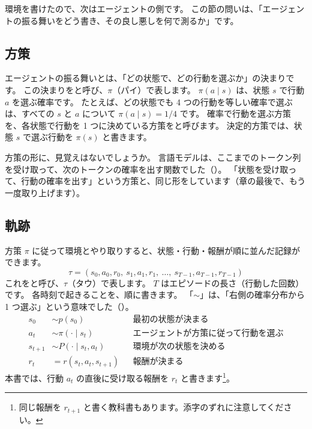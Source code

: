環境を書けたので、次はエージェントの側です。
この節の問いは、「エージェントの振る舞いをどう書き、その良し悪しを何で測るか」です。

\subsection*{方策}

エージェントの振る舞いとは、「どの状態で、どの行動を選ぶか」の決まりです。
この決まりをと呼び、$\pi$（パイ）で表します。
$\pi(a\mid s)$ は、状態 $s$ で行動 $a$ を選ぶ確率です。
たとえば、どの状態でも 4 つの行動を等しい確率で選ぶは、すべての $s$ と $a$ について $\pi(a\mid s)=1/4$ です。
確率で行動を選ぶ方策を、各状態で行動を 1 つに決めている方策をと呼びます。
決定的方策では、状態 $s$ で選ぶ行動を $\pi(s)$ と書きます。

方策の形に、見覚えはないでしょうか。
言語モデルは、ここまでのトークン列を受け取って、次のトークンの確率を出す関数でした（）。
「状態を受け取って、行動の確率を出す」という方策と、同じ形をしています（章の最後で、もう一度取り上げます）。

\subsection*{軌跡}

方策 $\pi$ に従って環境とやり取りすると、状態・行動・報酬が順に並んだ記録ができます。
\begin{equation}
\tau=(s_0,a_0,r_0,\ s_1,a_1,r_1,\ \dots,\ s_{T-1},a_{T-1},r_{T-1})
\label{eq:rlb-trajectory}
\end{equation}
これをと呼び、$\tau$（タウ）で表します。
$T$ はエピソードの長さ（行動した回数）です。
各時刻で起きることを、順に書きます。
「$\sim$」は、「右側の確率分布から 1 つ選ぶ」という意味でした（）。
\begin{align*}
s_0&\sim p(s_0) && \text{最初の状態が決まる}\\
a_t&\sim \pi(\cdot\mid s_t) && \text{エージェントが方策に従って行動を選ぶ}\\
s_{t+1}&\sim P(\cdot\mid s_t,a_t) && \text{環境が次の状態を決める}\\
r_t&=r(s_t,a_t,s_{t+1}) && \text{報酬が決まる}
\end{align*}
本書では、行動 $a_t$ の直後に受け取る報酬を $r_t$ と書きます\footnote{同じ報酬を $r_{t+1}$ と書く教科書もあります\cite{sutton2018rl}。添字のずれに注意してください。}。

